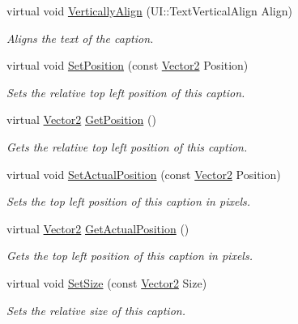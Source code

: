 \begin{DoxyCompactItemize}
virtual void \hyperlink{classphys_1_1UI_1_1Caption_adb3936d7eea2137e60943825acf4a5d0}{VerticallyAlign} (UI::TextVerticalAlign Align)
\begin{DoxyCompactList}\small\item\em Aligns the text of the caption. \item\end{DoxyCompactList}\item 
virtual void \hyperlink{classphys_1_1UI_1_1Caption_a3a0e4e927afe9c8fb7fd4f3771fc3bd0}{SetPosition} (const \hyperlink{classphys_1_1Vector2}{Vector2} Position)
\begin{DoxyCompactList}\small\item\em Sets the relative top left position of this caption. \item\end{DoxyCompactList}\item 
virtual \hyperlink{classphys_1_1Vector2}{Vector2} \hyperlink{classphys_1_1UI_1_1Caption_a3096383b16f81c3b4894afd61110ffa0}{GetPosition} ()
\begin{DoxyCompactList}\small\item\em Gets the relative top left position of this caption. \item\end{DoxyCompactList}\item 
virtual void \hyperlink{classphys_1_1UI_1_1Caption_a49b9972c95d710a9496d9cc2ca486890}{SetActualPosition} (const \hyperlink{classphys_1_1Vector2}{Vector2} Position)
\begin{DoxyCompactList}\small\item\em Sets the top left position of this caption in pixels. \item\end{DoxyCompactList}\item 
virtual \hyperlink{classphys_1_1Vector2}{Vector2} \hyperlink{classphys_1_1UI_1_1Caption_aae3e6728a26111e12b081992d6d04e1a}{GetActualPosition} ()
\begin{DoxyCompactList}\small\item\em Gets the top left position of this caption in pixels. \item\end{DoxyCompactList}\item 
virtual void \hyperlink{classphys_1_1UI_1_1Caption_a9551a0efc894dd97cead9db69f018f5d}{SetSize} (const \hyperlink{classphys_1_1Vector2}{Vector2} Size)
\begin{DoxyCompactList}\small\item\em Sets the relative size of this caption. \item\end{DoxyCompactList}\item 

\end{DoxyCompactItemize}
